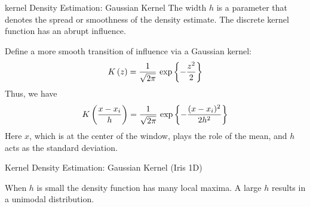 \begin{frame}{kernel Density Estimation: Gaussian Kernel}
The width $h$ is a parameter that
denotes the spread or smoothness of the density estimate.
The discrete kernel function has
an abrupt influence. 

\medskip
Def\/{i}ne a more smooth
transition of influence via a Gaussian kernel:
\begin{align*}
  K\left(z\right) =
  \frac{1}{\sqrt{2\pi}}\,\exp\left\{-\frac{z^2}{2}\right\}
\end{align*}
Thus, we have
\begin{align*}
  K\left(\frac{x-x_i}{h}\right) =
  \frac{1}{\sqrt{2\pi}}\,\exp\left\{-\frac{(x-x_i)^2}{2h^2}\right\}
\end{align*}
Here $x$, which is at the center of the window, plays the role of
the mean, and $h$ acts as the standard deviation.
\end{frame}


\begin{frame}[fragile]{Kernel Density Estimation: Gaussian Kernel (Iris
  1D)}
\setcounter{subfigure}{0}
\vspace*{-0.7cm}
\begin{figure}[!t]%
\centerline{
\hspace{-0.3in}
}
\vspace*{-0.7cm}
\centerline{
\hspace{-0.3in}
}
\end{figure}
\small
  When $h$ is small
the density function has many
  local maxima. A large $h$ results in a unimodal distribution.

\end{frame}


